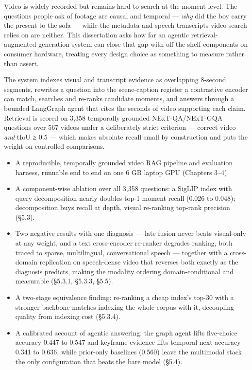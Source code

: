 Video is widely recorded but remains hard to search at the moment level.
The questions people ask of footage are causal and temporal ---
\emph{why} did the boy carry the present to the sofa --- while the
metadata and speech transcripts video search relies on are neither. This
dissertation asks how far an agentic retrieval-augmented generation
system can close that gap with off-the-shelf components on consumer
hardware, treating every design choice as something to measure rather
than assert.

The system indexes visual and transcript evidence as overlapping
8-second segments, rewrites a question into the scene-caption register a
contrastive encoder can match, searches and re-ranks candidate moments,
and answers through a bounded LangGraph agent that cites the seconds of
video supporting each claim. Retrieval is scored on 3,358 temporally
grounded NExT-QA/NExT-GQA questions over 567 videos under a deliberately
strict criterion --- correct video \emph{and} tIoU ≥ 0.5 --- which makes
absolute recall small by construction and puts the weight on controlled
comparisons.

\begin{itemize}
\tightlist
\item
  A reproducible, temporally grounded video RAG pipeline and evaluation
  harness, runnable end to end on one 6 GB laptop GPU (Chapters 3--4).
\item
  A component-wise ablation over all 3,358 questions: a SigLIP index
  with query decomposition nearly doubles top-1 moment recall (0.026 to
  0.048); decomposition buys recall at depth, visual re-ranking top-rank
  precision (§5.3).
\item
  Two negative results with one diagnosis --- late fusion never beats
  visual-only at any weight, and a text cross-encoder re-ranker degrades
  ranking, both traced to sparse, multilingual, conversational speech
  --- together with a cross-domain replication on speech-dense video
  that reverses both exactly as the diagnosis predicts, making the
  modality ordering domain-conditional and measurable (§5.3.1, §5.3.3,
  §5.5).
\item
  A two-stage equivalence finding: re-ranking a cheap index's top-30
  with a stronger backbone matches indexing the whole corpus with it,
  decoupling quality from indexing cost (§5.3.4).
\item
  A calibrated account of agentic answering: the graph agent lifts
  five-choice accuracy 0.447 to 0.547 and keyframe evidence lifts
  temporal-next accuracy 0.341 to 0.636, while prior-only baselines
  (0.560) leave the multimodal stack the only configuration that beats
  the bare model (§5.4).
\end{itemize}
